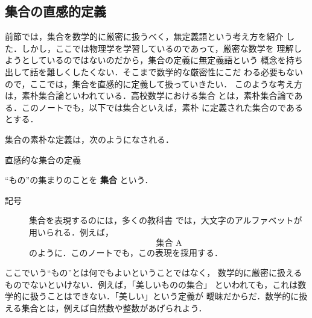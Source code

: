             \subsection{集合の直感的定義}
                前節では，集合を数学的に厳密に扱うべく，無定義語という考え方を紹介
                した．しかし，ここでは物理学を学習しているのであって，厳密な数学を
                理解しようとしているのではないのだから，集合の定義に無定義語という
                概念を持ち出して話を難しくしたくない．そこまで数学的な厳密性にこだ
                わる必要もないので，ここでは，集合を直感的に定義して扱っていきたい．
                このような考え方は，素朴集合論といわれている．高校数学における集合
                とは，素朴集合論である．このノートでも，以下では集合といえば，素朴
                に定義された集合のであるとする．

                集合の素朴な定義は，次のようになされる．
                    \begin{myshadebox}{直感的な集合の定義}
                        \begin{dfn}\label{dfn:set}
                        “もの”の集まりのことを \textbf{集合} という．
                            \begin{description}
                                \item[記号] 集合を表現するのには，多くの教科書
                                では，大文字のアルファベットが用いられる．例えば，
                                    \begin{equation*}
                                        \mbox{集合 A}
                                    \end{equation*}
                                のように．このノートでも，この表現を採用する．
                            \end{description}
                        \end{dfn}
                    \end{myshadebox}

                ここでいう“もの”とは何でもよいということではなく，
                数学的に厳密に扱えるものでないといけない．例えば，「美しいものの集合」
                といわれても，これは数学的に扱うことはできない．「美しい」という定義が
                曖昧だからだ．数学的に扱える集合とは，例えば自然数や整数があげられよう．

